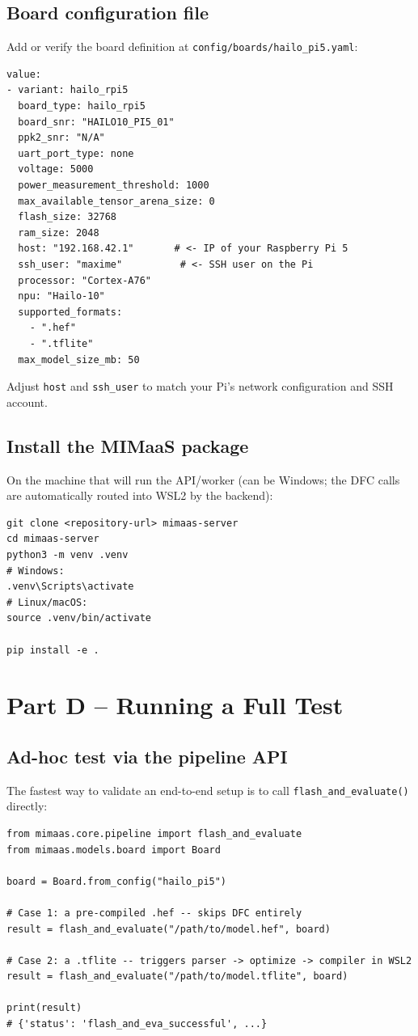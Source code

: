 \documentclass[11pt]{article}
\begin{document}
\subsection{Board configuration file}
Add or verify the board definition at
\texttt{config/boards/hailo\_pi5.yaml}:
\begin{lstlisting}
value:
- variant: hailo_rpi5
  board_type: hailo_rpi5
  board_snr: "HAILO10_PI5_01"
  ppk2_snr: "N/A"
  uart_port_type: none
  voltage: 5000
  power_measurement_threshold: 1000
  max_available_tensor_arena_size: 0
  flash_size: 32768
  ram_size: 2048
  host: "192.168.42.1"       # <- IP of your Raspberry Pi 5
  ssh_user: "maxime"          # <- SSH user on the Pi
  processor: "Cortex-A76"
  npu: "Hailo-10"
  supported_formats:
    - ".hef"
    - ".tflite"
  max_model_size_mb: 50
\end{lstlisting}
Adjust \texttt{host} and \texttt{ssh\_user} to match your Pi's network
configuration and SSH account.

\subsection{Install the MIMaaS package}
On the machine that will run the API/worker (can be Windows; the DFC calls
are automatically routed into WSL2 by the backend):
\begin{lstlisting}
git clone <repository-url> mimaas-server
cd mimaas-server
python3 -m venv .venv
# Windows:
.venv\Scripts\activate
# Linux/macOS:
source .venv/bin/activate

pip install -e .
\end{lstlisting}

\section{Part D -- Running a Full Test}

\subsection{Ad-hoc test via the pipeline API}
The fastest way to validate an end-to-end setup is to call
\texttt{flash\_and\_evaluate()} directly:
\begin{lstlisting}
from mimaas.core.pipeline import flash_and_evaluate
from mimaas.models.board import Board

board = Board.from_config("hailo_pi5")

# Case 1: a pre-compiled .hef -- skips DFC entirely
result = flash_and_evaluate("/path/to/model.hef", board)

# Case 2: a .tflite -- triggers parser -> optimize -> compiler in WSL2
result = flash_and_evaluate("/path/to/model.tflite", board)

print(result)
# {'status': 'flash_and_eva_successful', ...}
\end{lstlisting}
\end{document}
